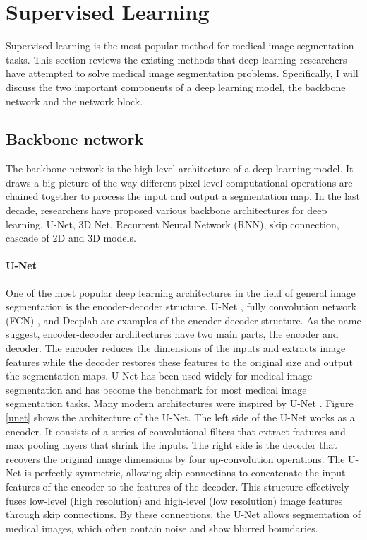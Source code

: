 \documentclass [11pt, proquest] {uwthesis}[2020/02/24]
\begin{document}
\section{Supervised Learning}

Supervised learning is the most popular method for medical image segmentation tasks. 
This section reviews the existing methods that deep learning researchers have attempted 
to solve medical image segmentation problems. Specifically, I will discuss the two 
important components of a deep learning model, the backbone network and the network block.

\subsection{Backbone network}

The backbone network is the high-level architecture of a deep learning model. 
It draws a big picture of the way different pixel-level computational operations 
are chained together to process the input and output a segmentation map. In the 
last decade, researchers have proposed various backbone architectures for deep 
learning, U-Net, 3D Net, Recurrent Neural Network (RNN), skip connection, cascade 
of 2D and 3D models.

\paragraph{U-Net}

One of the most popular deep learning architectures in the field of general image 
segmentation is the encoder-decoder structure. U-Net \cite{ navab_u-net_2015}, 
fully convolution network (FCN) \cite{long_fully_nodate}, and Deeplab \cite{chen_rethinking_2017} 
are examples of the encoder-decoder structure. As the name suggest, encoder-decoder 
architectures have two main parts, the encoder and decoder. The encoder reduces the 
dimensions of the inputs and extracts image features while the decoder restores these 
features to the original size and output the segmentation maps. U-Net has been used 
widely for medical image segmentation and has become the benchmark for most medical 
image segmentation tasks\cite{ei_medical_2020}. Many modern architectures were inspired by U-Net 
\cite{wang_non-local_2020, zhou_unet_2020, jha_doubleu-net_2020, alom_recurrent_nodate}. 
Figure \ref{unet} shows the architecture of the U-Net. The left side of the U-Net works 
as a encoder. It consists of a series of convolutional filters that extract features 
and max pooling layers that shrink the inputs. The right side is the decoder that 
recovers the original image dimensions by four up-convolution operations. The U-Net 
is perfectly symmetric, allowing skip connections to concatenate the input features 
of the encoder to the features of the decoder. This structure effectively fuses 
low-level (high resolution) and high-level (low resolution) image features through 
skip connections. By these connections, the U-Net allows segmentation of medical 
images, which often contain noise and show blurred boundaries.
\end{document}
